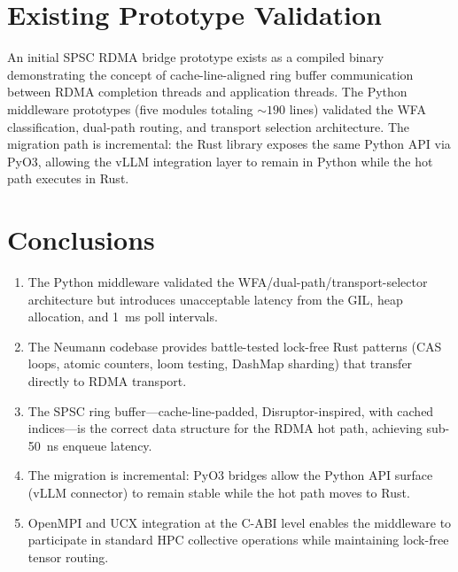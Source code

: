 \documentclass[11pt,letterpaper]{article}
\begin{document}
\section{Existing Prototype Validation}

An initial SPSC RDMA bridge prototype exists as a compiled binary demonstrating the concept of cache-line-aligned ring buffer communication between RDMA completion threads and application threads. The Python middleware prototypes (five modules totaling ${\sim}190$ lines) validated the WFA classification, dual-path routing, and transport selection architecture. The migration path is incremental: the Rust library exposes the same Python API via PyO3, allowing the vLLM integration layer to remain in Python while the hot path executes in Rust.

\section{Conclusions}

\begin{enumerate}
    \item The Python middleware validated the WFA/dual-path/transport-selector architecture but introduces unacceptable latency from the GIL, heap allocation, and 1~ms poll intervals.

    \item The Neumann codebase provides battle-tested lock-free Rust patterns (CAS loops, atomic counters, loom testing, DashMap sharding) that transfer directly to RDMA transport.

    \item The SPSC ring buffer---cache-line-padded, Disruptor-inspired, with cached indices---is the correct data structure for the RDMA hot path, achieving sub-50~ns enqueue latency.

    \item The migration is incremental: PyO3 bridges allow the Python API surface (vLLM connector) to remain stable while the hot path moves to Rust.

    \item OpenMPI and UCX integration at the C-ABI level enables the middleware to participate in standard HPC collective operations while maintaining lock-free tensor routing.
\end{enumerate}



\end{document}

